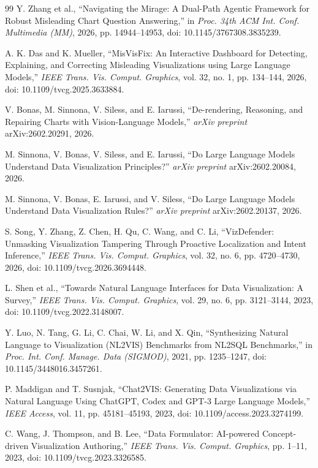 \documentclass[conference]{IEEEtran}
\begin{document}
\begin{thebibliography}{99}
Y. Zhang et al., ``Navigating the Mirage: A Dual-Path Agentic Framework for Robust Misleading Chart Question Answering,'' in \emph{Proc. 34th ACM Int. Conf. Multimedia (MM)}, 2026, pp. 14944--14953, doi: 10.1145/3767308.3835239.

A. K. Das and K. Mueller, ``MisVisFix: An Interactive Dashboard for Detecting, Explaining, and Correcting Misleading Visualizations using Large Language Models,'' \emph{IEEE Trans. Vis. Comput. Graphics}, vol. 32, no. 1, pp. 134--144, 2026, doi: 10.1109/tvcg.2025.3633884.

V. Bonas, M. Sinnona, V. Siless, and E. Iarussi, ``De-rendering, Reasoning, and Repairing Charts with Vision-Language Models,'' \emph{arXiv preprint} arXiv:2602.20291, 2026.

M. Sinnona, V. Bonas, V. Siless, and E. Iarussi, ``Do Large Language Models Understand Data Visualization Principles?'' \emph{arXiv preprint} arXiv:2602.20084, 2026.

M. Sinnona, V. Bonas, E. Iarussi, and V. Siless, ``Do Large Language Models Understand Data Visualization Rules?'' \emph{arXiv preprint} arXiv:2602.20137, 2026.

S. Song, Y. Zhang, Z. Chen, H. Qu, C. Wang, and C. Li, ``VizDefender: Unmasking Visualization Tampering Through Proactive Localization and Intent Inference,'' \emph{IEEE Trans. Vis. Comput. Graphics}, vol. 32, no. 6, pp. 4720--4730, 2026, doi: 10.1109/tvcg.2026.3694448.

L. Shen et al., ``Towards Natural Language Interfaces for Data Visualization: A Survey,'' \emph{IEEE Trans. Vis. Comput. Graphics}, vol. 29, no. 6, pp. 3121--3144, 2023, doi: 10.1109/tvcg.2022.3148007.

Y. Luo, N. Tang, G. Li, C. Chai, W. Li, and X. Qin, ``Synthesizing Natural Language to Visualization (NL2VIS) Benchmarks from NL2SQL Benchmarks,'' in \emph{Proc. Int. Conf. Manage. Data (SIGMOD)}, 2021, pp. 1235--1247, doi: 10.1145/3448016.3457261.

P. Maddigan and T. Susnjak, ``Chat2VIS: Generating Data Visualizations via Natural Language Using ChatGPT, Codex and GPT-3 Large Language Models,'' \emph{IEEE Access}, vol. 11, pp. 45181--45193, 2023, doi: 10.1109/access.2023.3274199.

C. Wang, J. Thompson, and B. Lee, ``Data Formulator: AI-powered Concept-driven Visualization Authoring,'' \emph{IEEE Trans. Vis. Comput. Graphics}, pp. 1--11, 2023, doi: 10.1109/tvcg.2023.3326585.


\end{thebibliography}
\end{document}
